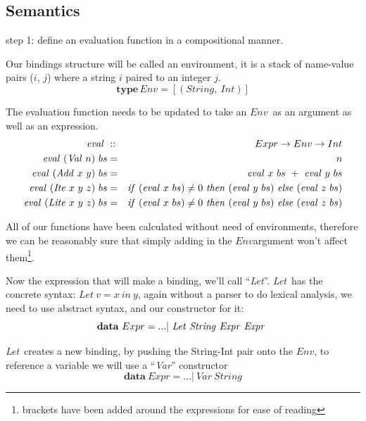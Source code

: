 \documentclass {article}
\begin{document}
\newcommand{\Context}{\mathit{Context\ }}
\newcommand{\Cxt}{\mathit{Cxt\ }}
\newcommand{\Contextt}{\textit{Context\ }}
\newcommand{\Cxtt}{\textit{Cxt\ }}
\newcommand{\leet}{\textit{Let}}
\newcommand{\Let}{\mathit{Let\ }}
\newcommand{\Var}{\mathit{Var\ }}
\newcommand{\VAR}{\mathit{VAR\ }}
\newcommand{\var}{\textit{Var}}
\newcommand{\cxtm}{\mathit{cxt\ }}
\newcommand{\TEL}{\mathit{TEL\ }}
\newcommand{\LET}{\mathit{LET\ }}


\subsection{Semantics}

step 1: define an evaluation 
	function in a compositional manner.

\newcommand{\env}{$Env$}
Our bindings structure will be called
an environment, it is a stack
of name-value pairs ($i$, $j$) where
a string $i$ paired to an integer $j$.
	\[ \textbf{type} \, Env = [(String,\ Int)]\]

The evaluation function needs to be updated
to take an \env\ as an argument as well as
an expression.
\begin{eqnarray*}
	\evalf &::&\  Expr \rightarrow Env \rightarrow Int \\
	\evalf  (\Val n)\ bs 		&=&   n \\
	\evalf  (\Add x\ y)\ bs		&=&   \evalf  x\ bs\ +\ \evalf  y\ bs \\
	\evalf  (\Ite x\ y\ z)\ bs	&=&   \ifff (\evalf  x\ bs) \not= 0\ \tthen (\evalf  y\ bs)\ \eelse (\evalf  z\ bs) \\
	\evalf  (\Lite x\ y\ z)\ bs 	&=&   \ifff (\evalf  x\ bs) \not= 0\ \tthen (\evalf  y\ bs)\ \eelse (\evalf  z\ bs)
\end{eqnarray*}

All of our functions
have been calculated without need of environments,
therefore we can be reasonably sure that simply adding in the
\env argument won't affect them\footnote{
brackets have been added around the expressions for ease of reading}.

Now the expression that will make a binding,
we'll call ``\leet''.
\leet\ has the concrete syntax:
\( \Let v = x\ in\ y\),
again without a parser to do
lexical analysis, we need to use
abstract syntax, and our constructor
for it:
\[ \textbf{data}\ Expr = ... |\ \Let \String \Expr \Expr \]

\leet\ creates a new binding,
by pushing the String-Int pair
onto the \env, to reference a variable we will
use a ``\var'' constructor
\[ \textbf{data}\ Expr = ... |\ Var\ String \]
\end{document}
